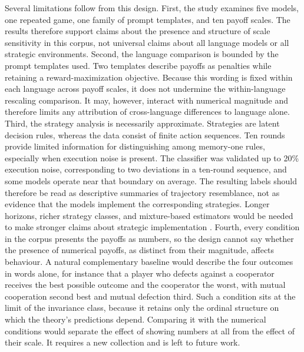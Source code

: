 \documentclass[11pt,a4paper]{article}
\newcommand{\rev}[1]{{\color{red}#1}}
\newcommand{\rev}[1]{#1}
\begin{document}
Several limitations follow from this design. First, the study examines five models, one repeated game, one family of prompt templates, and ten payoff scales. The results therefore support claims about the presence and structure of scale sensitivity in this corpus, not universal claims about all language models or all strategic environments. Second, the language comparison is bounded by the prompt templates used. Two templates describe payoffs as penalties while retaining a reward-maximization objective. Because this wording is fixed within each language across payoff scales, it does not undermine the within-language rescaling comparison. It may, however, interact with numerical magnitude and therefore limits any attribution of cross-language differences to language alone.
Third, the strategy analysis is necessarily approximate. Strategies are latent decision rules, whereas the data consist of finite action sequences. Ten rounds provide limited information for distinguishing among memory-one rules, especially when execution noise is present. The classifier was validated up to 20\% execution noise, corresponding to two deviations in a ten-round sequence, and some models operate near that boundary on average. The resulting labels should therefore be read as descriptive summaries of trajectory resemblance, not as evidence that the models implement the corresponding strategies. Longer horizons, richer strategy classes, and mixture-based estimators would be needed to make stronger claims about strategic implementation \cite{inferenceStrategies,hilbe2013memory,han2013intention}.
\rev{Fourth, every condition in the corpus presents the payoffs as numbers, so the
design cannot say whether the presence of numerical payoffs, as distinct from
their magnitude, affects behaviour. A natural complementary baseline would
describe the four outcomes in words alone, for instance that a player who
defects against a cooperator receives the best possible outcome and the
cooperator the worst, with mutual cooperation second best and mutual defection
third. Such a condition sits at the limit of the invariance class, because it
retains only the ordinal structure on which the theory's predictions depend.
Comparing it with the numerical conditions would separate the effect of
showing numbers at all from the effect of their scale. It requires a new
collection and is left to future work.}
\end{document}
